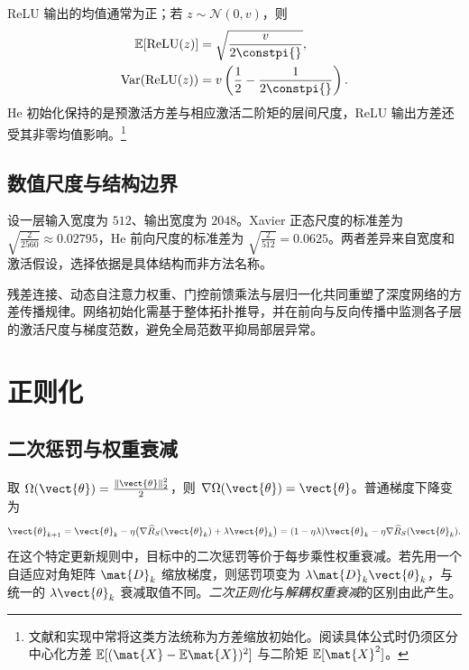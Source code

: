 \documentclass[../textbook.tex]{subfiles}
\begin{document}
ReLU 输出的均值通常为正；若 $z\sim\mathcal N(0,v)$，则
\begin{equation}
\begin{aligned}
 \mathbb E[\operatorname{ReLU}(z)] &= \sqrt{\frac v{2\constpi{}}}, \\
 \operatorname{Var}(\operatorname{ReLU}(z)) &= v\left(\frac12-\frac1{2\constpi{}}\right).
\end{aligned}
\end{equation}
He 初始化保持的是预激活方差与相应激活二阶矩的层间尺度，ReLU 输出方差还受其非零均值影响。\footnote{文献和实现中常将这类方法统称为方差缩放初始化。阅读具体公式时仍须区分中心化方差 $\mathbb E[(\mat{X}-\mathbb E\mat{X})^2]$ 与二阶矩 $\mathbb E[\mat{X}^2]$。}

\subsection{数值尺度与结构边界}
设一层输入宽度为 $512$、输出宽度为 $2048$。Xavier 正态尺度的标准差为
$\sqrt{\frac{2}{2560}}\approx0.02795$，He 前向尺度的标准差为 $\sqrt{\frac{2}{512}}=0.0625$。两者差异来自宽度和激活假设，选择依据是具体结构而非方法名称。

残差连接、动态自注意力权重、门控前馈乘法与层归一化共同重塑了深度网络的方差传播规律。网络初始化需基于整体拓扑推导，并在前向与反向传播中监测各子层的激活尺度与梯度范数，避免全局范数平抑局部层异常。

\section{正则化}

\subsection{二次惩罚与权重衰减}
取 $\Omega(\vect{\theta})=\frac{\|\vect{\theta}\|_2^2}{2}$，则 $\nabla\Omega(\vect{\theta})=\vect{\theta}$。普通梯度下降变为
\begin{equation}
 \vect{\theta}_{k+1}=\vect{\theta}_k-\eta\bigl(\nabla\widehat R_S(\vect{\theta}_k)+\lambda\vect{\theta}_k\bigr)
 =(1-\eta\lambda)\vect{\theta}_k-\eta\nabla\widehat R_S(\vect{\theta}_k).
\end{equation}
在这个特定更新规则中，目标中的二次惩罚等价于每步乘性权重衰减。若先用一个自适应对角矩阵 $\mat{D}_k$ 缩放梯度，则惩罚项变为 $\lambda \mat{D}_k\vect{\theta}_k$，与统一的 $\lambda\vect{\theta}_k$ 衰减取值不同。\emph{二次正则化}与\emph{解耦权重衰减}的区别由此产生。

\end{document}
